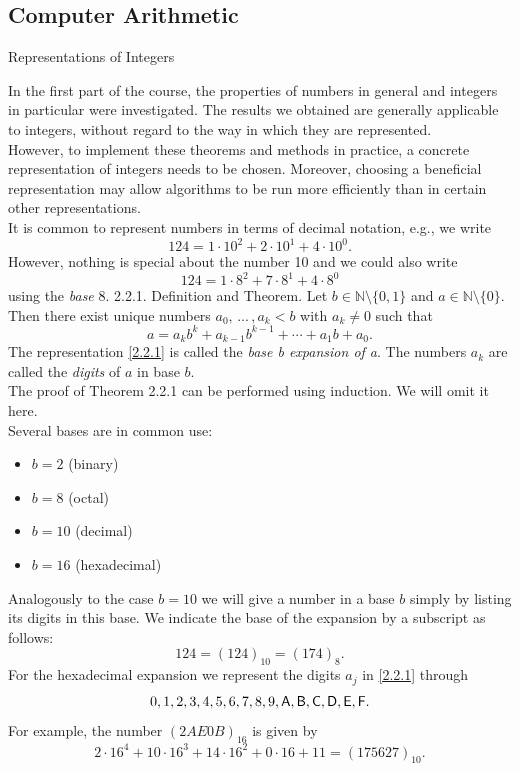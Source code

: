 \documentclass[smaller,hyperref={CJKbookmarks=true}]{beamer}
\newcommand{\N}{\mathbb{N}} \newcommand{\Z}{\mathbb{Z}} \newcommand{\Q}{\mathbb{Q}}
\newcounter{zhuo}[subsection]
\begin{document}
\subsection{Computer Arithmetic}
\begin{frame}[c] \begin{spacing}{2.5}
\tableofcontents[sectionstyle=hide,subsectionstyle=show/shaded/hide] \end{spacing}
\end{frame}
\begin{frame}{Representations of Integers}
\begin{spacing}{1.0}
In the first part of the course, the properties of numbers in general and
integers in particular were investigated. The results we obtained are
generally applicable to integers, without regard to the way in which they
are represented.\\[5pt]
However, to implement these theorems and methods in practice, a
concrete representation of integers needs to be chosen. Moreover,
choosing a beneficial representation may allow algorithms to be run more
efficiently than in certain other representations.\\[5pt]
It is common to represent numbers in terms of decimal notation, e.g., we
write
\[124=1\cdot10^2+2\cdot10^1+4\cdot10^0.\]
However, nothing is special about the number 10 and we could also write
\[124=1\cdot8^2+7\cdot8^1+4\cdot8^0\]
using the \emph{base} 8.
\newpage
{}
\alert{2.2.1. Definition and Theorem.} Let $b\in\N\setminus\{0,1\}$ and $a\in\N\setminus\{0\}$. Then there exist unique numbers $a_0,\,...\,,a_k<b$ with $a_k\neq0$ such that
\setcounter{equation}{0}
\begin{equation}\label{2.2.1}
a=a_kb^k+a_{k-1}b^{k-1}+\cdots+a_1b+a_0.
\end{equation}
The representation \eqref{2.2.1} is called the \emph{base b expansion of a}. The numbers $a_k$ are called the \emph{digits} of $a$ in base $b$.\\[5pt]
The proof of Theorem 2.2.1 can be performed using induction. We will omit it here.\\[5pt]
Several bases are in common use:
\begin{itemize}
  \item $b=2$ (binary)
  \item $b=8$ (octal)
  \item $b=10$ (decimal)
  \item $b=16$ (hexadecimal)
\end{itemize}
\end{spacing}
\newpage
\begin{spacing}{1.2}
Analogously to the case $b = 10$ we will give a number in a base $b$ simply
by listing its digits in this base. We indicate the base of the expansion by a
subscript as follows:
\[124=(124)_{10}=(174)_8.\]
For the hexadecimal expansion we represent the digits $a_j$ in \eqref{2.2.1} through
\[0,1,2,3,4,5,6,7,8,9,\sf{A,B,C,D,E,F}.\]
For example, the number $(2AE0B)_{16}$ is given by
\[2\cdot16^4+10\cdot16^3+14\cdot16^2+0\cdot16+11
=(175627)_{10}.\]
\end{spacing}
\end{frame}
\end{document}
